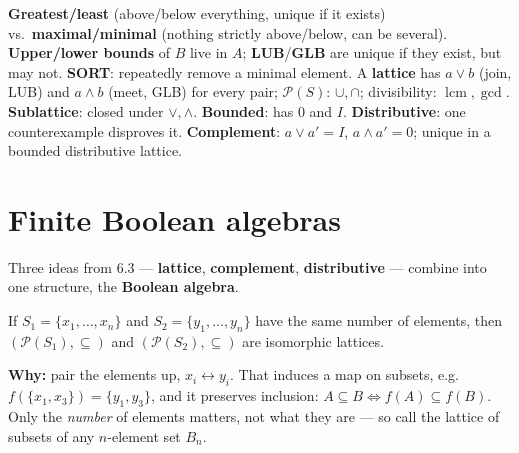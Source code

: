 \documentclass{fkt-notes}
\DeclareMathOperator{\lcm}{lcm}
\newcommand{\src}[1]{\par\noindent{\small\itshape Source: #1}\par\smallskip}
\newcommand{\kolman}[1]{\setcounter{section}{\numexpr#1-1\relax}}
\theoremstyle{definition}
\begin{document}
\begin{keybox}[title=Key points (6.2--6.3)]
  \textbf{Greatest/least} (above/below everything, unique if it exists)
  vs.\ \textbf{maximal/minimal} (nothing strictly above/below, can be
  several). \textbf{Upper/lower bounds} of $B$ live in $A$;
  \textbf{LUB}/\textbf{GLB} are unique if they exist, but may not.
  \textbf{SORT}: repeatedly remove a minimal element. A
  \textbf{lattice} has $a\vee b$ (join, LUB) and $a\wedge b$ (meet,
  GLB) for every pair; $\mathcal P(S)$: $\cup,\cap$; divisibility:
  $\lcm,\gcd$. \textbf{Sublattice}: closed under $\vee,\wedge$.
  \textbf{Bounded}: has $0$ and $I$. \textbf{Distributive}: one
  counterexample disproves it. \textbf{Complement}: $a\vee a'=I$,
  $a\wedge a'=0$; unique in a bounded distributive lattice.
\end{keybox}

\kolman{4}
\section{Finite Boolean algebras}\src{Kolman 6.4}
%

Three ideas from 6.3 --- \textbf{lattice}, \textbf{complement},
\textbf{distributive} --- combine into one structure, the
\textbf{Boolean algebra}.

\begin{rulebox}[title={6.4 Theorem 1}]
  If $S_1=\{x_1,\dots,x_n\}$ and $S_2=\{y_1,\dots,y_n\}$ have the same
  number of elements, then $(\mathcal P(S_1),\subseteq)$ and
  $(\mathcal P(S_2),\subseteq)$ are isomorphic lattices.
\end{rulebox}
\textbf{Why:} pair the elements up, $x_i\leftrightarrow y_i$. That
induces a map on subsets, e.g.\ $f(\{x_1,x_3\})=\{y_1,y_3\}$, and it
preserves inclusion: $A\subseteq B\iff f(A)\subseteq f(B)$. Only the
\emph{number} of elements matters, not what they are --- so call the
lattice of subsets of any $n$-element set $B_n$.
\end{document}
